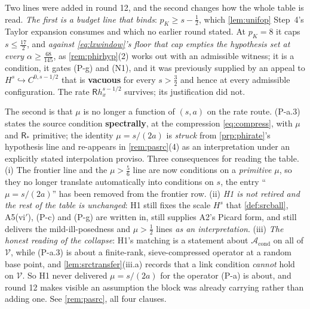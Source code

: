 Two lines were added in round 12, and the second changes how the whole table is read.
\emph{The first is a budget line that binds}: $p_K\ge s-\tfrac12$, which \cref{lem:unifop}
Step~4's Taylor expansion consumes and which no earlier round stated. At $p_K=8$ it caps
$s\le\tfrac{17}{2}$, and \emph{against \eqref{eq:lxwindow}'s floor that cap empties the hypothesis set
at every $\alpha\ge\tfrac{68}{145}$}, as \cref{rem:phirhyp}\textup{(2)} works out with an admissible
witness; it is a condition,
it gates (P-g) and (N1), and it was previously supplied by an appeal to
$H^{s}\hookrightarrow C^{0,s-1/2}$ that is \textbf{vacuous} for every $s>\tfrac32$ and hence at every
admissible configuration. The rate $\mathsf Rh_x^{s-1/2}$ survives; its justification did not.

The second is that $\mu$ is no longer a function of $(s,a)$ on the rate route. (P-a.3) states the
source condition \textbf{spectrally}, at the compression \eqref{eq:compress}, with $\mu$ and
$\mathsf R_\ast$ primitive; the identity $\mu=s/(2a)$ is \emph{struck} from \cref{prp:phirate}'s
hypothesis line and re-appears in \cref{rem:pasrc}(4) as an interpretation under an explicitly stated
interpolation proviso. Three consequences for reading the table. (i) The frontier line and the
$\mu>\tfrac56$ line are now conditions on a \emph{primitive} $\mu$, so they no longer translate
automatically into conditions on $s$, the entry ``$\mu=s/(2a)$'' has been removed from the frontier
row. (ii) \emph{H1 is not retired and the rest of the table is unchanged}: H1 still fixes the scale
$H^{s}$ that \cref{def:srcball}, A5(vi$'$), (P-c) and (P-g) are written in, still supplies A2's Picard
form, and still delivers the mild-ill-posedness and $\mu>\tfrac12$ lines \emph{as an interpretation}.
(iii) \emph{The honest reading of the collapse}: H1's matching is a statement about
$\mathcal A_{\mathrm{cond}}$ on all of $\mathcal V$, while (P-a.3) is about a finite-rank, sieve-compressed
operator at a random base point, and \cref{lem:srctransfer}(iii.a) records that a link condition
\emph{cannot} hold on $\mathcal V$. So H1 never delivered $\mu=s/(2a)$ for the operator (P-a) is about,
and round 12 makes visible an assumption the block was already carrying rather than adding one. See
\cref{rem:pasrc}, all four clauses.

